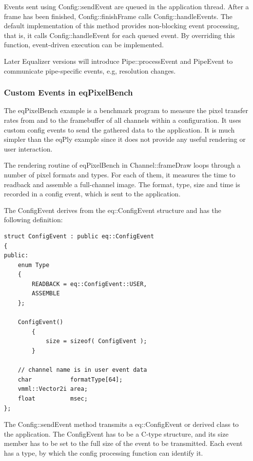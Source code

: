\documentclass[10pt,a4]{scrartcl}
\begin{document}
Events sent using \textsf{Config::sendEvent} are queued in the
application thread. After a frame has been finished,
\textsf{Config::finishFrame} calls \textsf{Config::handleEvents}. The
default implementation of this method provides non-blocking event
processing, that is, it calls \textsf{Config::handleEvent} for each
queued event. By overriding this function, event-driven execution can be
implemented.

Later Equalizer versions will introduce \textsf{Pipe::processEvent} and
\textsf{PipeEvent} to communicate pipe-specific events, e.g, resolution
changes.

\subsubsection{Custom Events in eqPixelBench}

The \textsf{eqPixelBench} example is a benchmark program to measure the
pixel transfer rates from and to the framebuffer of all channels within
a configuration. It uses custom config events to send the gathered data
to the application. It is much simpler than the \textsf{eqPly} example
since it does not provide any useful rendering or user interaction.

The rendering routine of \textsf{eqPixelBench} in
\textsf{Channel::frameDraw} loops through a number of pixel formats and
types. For each of them, it measures the time to readback and assemble a
full-channel image. The format, type, size and time is recorded in a
config event, which is sent to the application.

The \textsf{ConfigEvent} derives from the \textsf{eq::ConfigEvent}
structure and has the following definition:

{\footnotesize\begin{lstlisting}
struct ConfigEvent : public eq::ConfigEvent
{
public:
    enum Type
    {
        READBACK = eq::ConfigEvent::USER,
        ASSEMBLE
    };

    ConfigEvent()
        {
            size = sizeof( ConfigEvent );
        }

    // channel name is in user event data
    char           formatType[64];
    vmml::Vector2i area;
    float          msec;
};
\end{lstlisting}}

The \textsf{Config::sendEvent} method transmits a
\textsf{eq::ConfigEvent} or derived class to the application. The
ConfigEvent has to be a C-type structure, and its \textsf{size}
member has to be set to the full size of the event to be transmitted.
Each event has a type, by which the config processing function can
identify it. 
\end{document}
